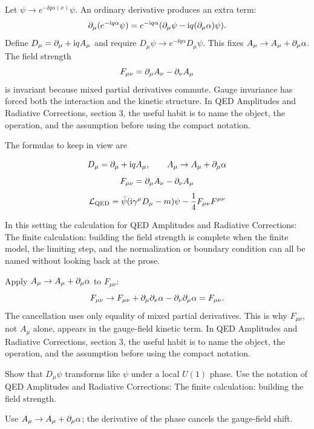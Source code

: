 Let \(\psi\to e^{-\ii q\alpha(x)}\psi\).  An ordinary derivative produces an extra term:
\[
  \partial_\mu(e^{-\mathrm i q\alpha}\psi)
  =
  e^{-\mathrm i q\alpha}(\partial_\mu\psi-\mathrm i q(\partial_\mu\alpha)\psi).
\]
Define \(D_\mu=\partial_\mu+\mathrm i qA_\mu\) and require \(D_\mu\psi\to e^{-\ii q\alpha}D_\mu\psi\).  This fixes \(A_\mu\to A_\mu+\partial_\mu\alpha\).  The field strength
\[
  F_{\mu\nu}=\partial_\mu A_\nu-\partial_\nu A_\mu
\]
is invariant because mixed partial derivatives commute.  Gauge invariance has forced both the interaction and the kinetic structure.  In QED Amplitudes and Radiative Corrections, section 3, the useful habit is to name the object, the operation, and the assumption before using the compact notation.

The formulas to keep in view are

\[
  D_\mu=\partial_\mu+\mathrm i qA_\mu,\qquad A_\mu\to A_\mu+\partial_\mu\alpha
\]
\[
  F_{\mu\nu}=\partial_\mu A_\nu-\partial_\nu A_\mu
\]
\[
  \mathcal L_{\mathrm{QED}}=\bar\psi(\mathrm i\gamma^\mu D_\mu-m)\psi-\frac14F_{\mu\nu}F^{\mu\nu}
\]

In this setting the calculation for QED Amplitudes and Radiative Corrections: The finite calculation: building the field strength is complete when the finite model, the limiting step, and the normalization or boundary condition can all be named without looking back at the prose.




\begin{example}
Apply \(A_\mu\to A_\mu+\partial_\mu\alpha\) to \(F_{\mu\nu}\):
\[
  F_{\mu\nu}\to F_{\mu\nu}+\partial_\mu\partial_\nu\alpha-\partial_\nu\partial_\mu\alpha=F_{\mu\nu}.
\]
The cancellation uses only equality of mixed partial derivatives.  This is why \(F_{\mu\nu}\), not \(A_\mu\) alone, appears in the gauge-field kinetic term.  In QED Amplitudes and Radiative Corrections, section 3, the useful habit is to name the object, the operation, and the assumption before using the compact notation.
\end{example}



\begin{exercise}
Show that \(D_\mu\psi\) transforms like \(\psi\) under a local \(U(1)\) phase.  Use the notation of QED Amplitudes and Radiative Corrections: The finite calculation: building the field strength.
\begin{answer}
Use \(A_\mu\to A_\mu+\partial_\mu\alpha\); the derivative of the phase cancels the gauge-field shift.
\end{answer}
\end{exercise}

